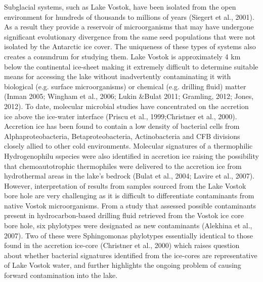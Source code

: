 \documentclass{book}
\begin{document}
Subglacial systems, such as Lake Vostok, have been isolated from the open environment for hundreds of thousands to millions of years (Siegert et al., 2001).
As a result they provide a reservoir of microorganisms that may have undergone significant evolutionary divergence from the same seed populations that were not isolated by the Antarctic ice cover. 
The uniqueness of these types of systems also creates a conundrum for studying them. 
Lake Vostok is approximately 4 km below the continental ice-sheet making it extremely difficult to determine suitable means for accessing the lake without inadvertently contaminating it with biological (e.g. surface microorganisms) or chemical (e.g. drilling fluid) matter (Inman 2005; Wingham et al., 2006; Lukin &Bulat 2011; Gramling, 2012; Jones, 2012). 
To date, molecular microbial studies have concentrated on the accretion ice above the ice-water interface (Priscu et al., 1999;Christner et al., 2000).
Accretion ice has been found to contain a low density of bacterial cells from Alphaproteobacteria, Betaproteobacteria, Actinobacteria and CFB divisions closely allied to other cold environments.
Molecular signatures of a thermophilic Hydrogenophilu sspecies were also identified in accretion ice raising the possibility that chemoautotrophic thermophiles were delivered to the accretion ice from hydrothermal areas in the lake’s bedrock (Bulat et al., 2004; Lavire et al., 2007).
However, interpretation of results from samples sourced from the Lake Vostok bore hole are very challenging as it is difficult to differentiate contaminants from native Vostok microorganisms.
From a study that assessed possible contaminants present in hydrocarbon-based drilling fluid retrieved from the Vostok ice core bore hole, six phylotypes were designated as new contaminants (Alekhina et al., 2007). 
Two of these were Sphingomonas phylotypes essentially identical to those found in the accretion ice-core (Christner et al., 2000) which raises question about whether bacterial signatures identified from the ice-cores are representative of Lake Vostok water, and further highlights the ongoing problem of causing forward contamination into the lake.
\end{document}
